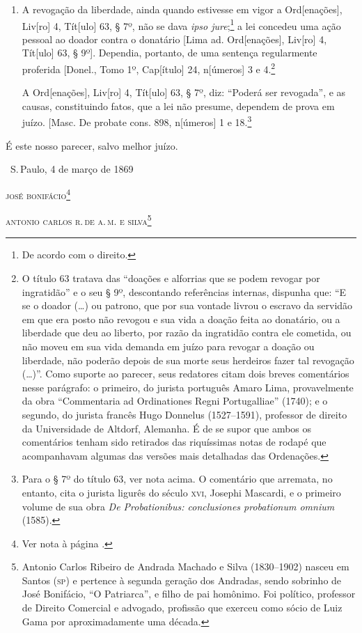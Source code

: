 \begin{enumerate}[label=Ao \arabic*º]
\item A revogação da liberdade, ainda quando estivesse em vigor a
Ord{[}enações{]}, Liv{[}ro{]} 4, Tít{[}ulo{]} 63, § 7º, não se dava
\emph{ipso jure};\footnote{De acordo com o direito.} a lei concedeu
uma ação pessoal ao doador contra o donatário {[}Lima ad.
Ord{[}enações{]}, Liv{[}ro{]} 4, Tít{[}ulo{]} 63, § 9º{]}. Dependia,
portanto, de uma sentença regularmente proferida {[}Donel., Tomo 1º,
Cap{[}ítulo{]} 24, n{[}úmeros{]} 3 e 4.\footnote{O título 63 tratava
  das ``doações e alforrias que se podem revogar por ingratidão'' e o seu
  § 9º, descontando referências internas, dispunha que: ``E se o doador
  (\ldots{}) ou patrono, que por sua vontade livrou o escravo da servidão em
  que era posto não revogou e sua vida a doação feita ao donatário, ou a
  liberdade que deu ao liberto, por razão da ingratidão contra ele
  cometida, ou não moveu em sua vida demanda em juízo para revogar a
  doação ou liberdade, não poderão depois de sua morte seus herdeiros
  fazer tal revogação (\ldots{})''. Como suporte ao parecer, seus redatores
  citam dois breves comentários nesse parágrafo: o primeiro, do jurista
  português Amaro Lima, provavelmente da obra ``Commentaria ad
  Ordinationes Regni Portugalliae'' (1740); e o segundo, do jurista
  francês Hugo Donnelus (1527--1591), professor de direito da
  Universidade de Altdorf, Alemanha. É de se supor que ambos os
  comentários tenham sido retirados das riquíssimas notas de rodapé que
  acompanhavam algumas das versões mais detalhadas das Ordenações.}

A Ord{[}enações{]}, Liv{[}ro{]} 4, Tít{[}ulo{]} 63, § 7º, diz: ``Poderá
ser revogada'', e as causas, constituindo fatos, que a lei não presume,
dependem de prova em juízo. {[}Masc. De probate cons. 898, n{[}úmeros{]}
1 e 18.\footnote{Para o § 7º do título 63, ver nota acima. O
  comentário que arremata, no entanto, cita o jurista ligurês do século
  \textsc{xvi}, Josephi Mascardi, e o primeiro volume de sua obra \emph{De
  Probationibus: conclusiones probationum omnium} (1585).}
\end{enumerate}

É este nosso parecer, salvo melhor juízo.

\hfill\ S.\,Paulo, 4 de março de 1869\smallskip

\hfill\textsc{josé bonifácio}\footnote{Ver nota à página \pageref{bonifacio}.}

\hfill\textsc{antonio carlos r.\,de a.\,m. e silva}\footnote{Antonio Carlos Ribeiro de
  Andrada Machado e Silva (1830--1902) nasceu em Santos (\textsc{sp}) e pertence à
  segunda geração dos Andradas, sendo sobrinho de José Bonifácio, ``O
  Patriarca'', e filho de pai homônimo. Foi político, professor de \label{machado}
  Direito Comercial e advogado, profissão que exerceu como sócio de Luiz
  Gama por aproximadamente uma década.}

